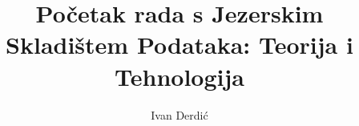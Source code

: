 \documentclass[times, utf8, seminar, numeric]{fer}
\begin{document}
\title{Početak rada s Jezerskim Skladištem Podataka: Teorija i Tehnologija}

\author{Ivan Derdić}


\maketitle

\tableofcontents















\end{document}
